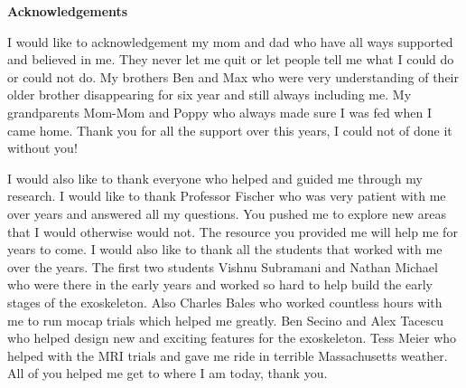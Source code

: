 \begin{center}
	\textbf{Acknowledgements}
	 
\end{center}

I would like to acknowledgement my mom and dad who have all ways supported and believed in me. They never let me quit or let people tell me what I could do or could not do. My brothers Ben and Max who were very understanding of their older brother disappearing for six year and still always including me. My grandparents Mom-Mom and Poppy who always made sure I was fed when I came home. Thank you for all the support over this years, I could not of done it without you!

I would also like to thank everyone who helped and guided me through my research. I would like to thank Professor Fischer who was very patient with me over years and answered all my questions. You pushed me to explore new areas that I would otherwise would not. The resource you provided me will help me for years to come. I would also like to thank all the students that worked with me over the years. The first two students Vishnu Subramani and Nathan Michael who were there in the early years and worked so hard to help build the early stages of the exoskeleton. Also Charles Bales who worked countless hours with me to run mocap trials which helped me greatly. Ben Secino and Alex Tacescu who helped design new and exciting features for the exoskeleton. Tess Meier who helped with the MRI trials and gave me ride in terrible Massachusetts weather. All of you helped me get to where I am today, thank you.  

\clearpage